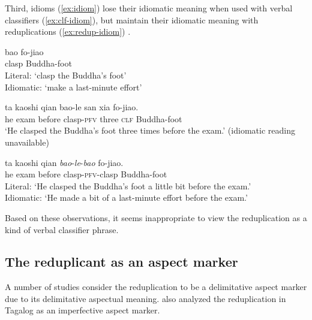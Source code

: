 Third, idioms (\ref{ex:idiom}) lose their idiomatic meaning when used with verbal classifiers (\ref{ex:clf-idiom}), but maintain their idiomatic meaning with reduplications (\ref{ex:redup-idiom}) \citep[230--231]{YangWei2017}.

\ea
  \ea\label{ex:idiom}
  \gll bao fo-jiao\\
  clasp Buddha-foot\\
   \glt Literal: `clasp the Buddha's foot'\\
   Idiomatic: `make a last-minute effort'
   
   \ex\label{ex:clf-idiom}
   \gll ta kaoshi qian bao-le san xia fo-jiao.\\
   he exam before clasp-\textsc{pfv} three \textsc{clf} Buddha-foot\\
   \glt `He clasped the Buddha's foot three times before the exam.' (idiomatic reading unavailable)
   
   \ex\label{ex:redup-idiom}
   \gll ta kaoshi qian \textit{bao}-\textit{le}-\textit{bao} fo-jiao.\\
   he exam before clasp-\textsc{pfv}-clasp Buddha-foot\\
   \glt Literal: `He clasped the Buddha's foot a little bit before the exam.'\\
   Idiomatic: `He made a bit of a last-minute effort before the exam.'
\z
\z

Based on these observations, it seems inappropriate to view the reduplication as a kind of verbal classifier phrase.






\subsection{The reduplicant as an aspect marker}\label{sec:asp}

A number of studies consider the reduplication to be a delimitative aspect marker \citep{Arcodiaetal2014, BascianoMelloni2017, YangWei2017} 
due to its delimitative aspectual meaning. 
\citet{Travis1999, Travis2000} also analyzed the reduplication in Tagalog as an imperfective aspect marker.
 
 
 
 
 
